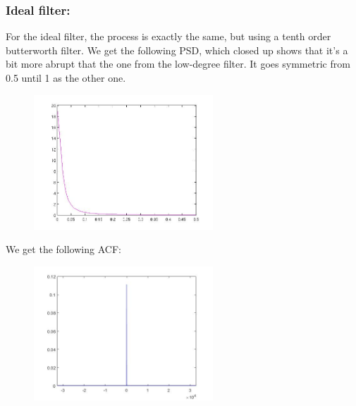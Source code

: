 \documentclass[a4paper,11pt]{article}
\begin{document}
\newpage

\subsubsection{Ideal filter:}

For the ideal filter, the process is exactly the same, but using a tenth order butterworth filter. We get the following PSD, which closed up shows that it's a bit more abrupt that the one from the low-degree filter. It goes symmetric from 0.5 until 1 as the other one.

\begin{figure}[!hp]
    \begin{center}
    \includegraphics[width=0.6\textwidth]{images/lab1_redo_figure13.jpg}
    \end{center}
\end{figure}

We get the following ACF:

\begin{figure}[!hp]
    \begin{center}
    \includegraphics[width=0.6\textwidth]{images/lab2_figure1.jpg}
    \end{center}
\end{figure}

\newpage
\end{document}
